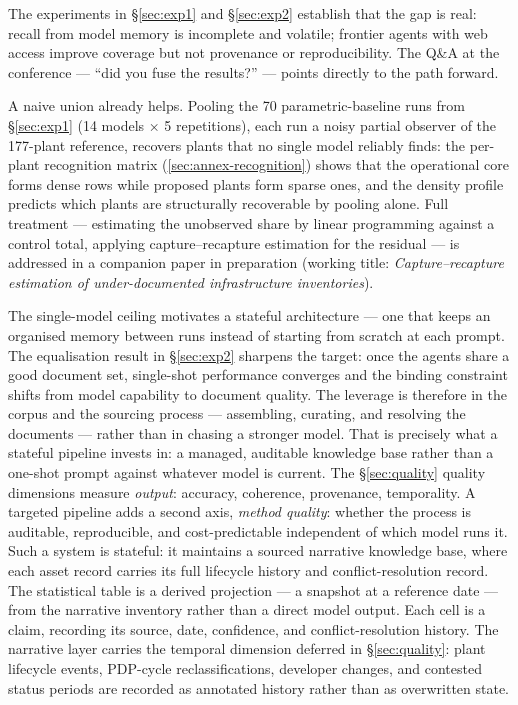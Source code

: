 \documentclass[a4paper,11pt]{article}
\begin{document}
The experiments in §\ref{sec:exp1} and §\ref{sec:exp2} establish that
the gap is real: recall from model memory is incomplete and volatile;
frontier agents with web access improve coverage but not provenance or
reproducibility. The Q\&A at the conference --- ``did you fuse the
results?'' --- points directly to the path forward.

A naive union already helps. Pooling the 70 parametric-baseline runs
from §\ref{sec:exp1} (14 models × 5 repetitions), each run a noisy
partial observer of the 177-plant reference, recovers plants that no
single model reliably finds: the per-plant recognition matrix
(\ref{sec:annex-recognition}) shows that the operational core forms
dense rows while proposed plants form sparse ones, and the density
profile predicts which plants are structurally recoverable by pooling
alone. Full treatment --- estimating the unobserved share by linear
programming against a control total, applying capture--recapture
estimation for the residual --- is addressed in a companion paper in
preparation (working title: \emph{Capture--recapture estimation of
under-documented infrastructure inventories}).

The single-model ceiling motivates a stateful architecture --- one that
keeps an organised memory between runs instead of starting from scratch
at each prompt. The equalisation result in §\ref{sec:exp2} sharpens the
target: once the agents share a good document set, single-shot
performance converges and the binding constraint shifts from model
capability to document quality. The leverage is therefore in the corpus
and the sourcing process --- assembling, curating, and resolving the
documents --- rather than in chasing a stronger model. That is precisely
what a stateful pipeline invests in: a managed, auditable knowledge base
rather than a one-shot prompt against whatever model is current. The
§\ref{sec:quality} quality dimensions measure \emph{output}: accuracy,
coherence, provenance, temporality. A targeted pipeline adds a second
axis, \emph{method quality}: whether the process is auditable,
reproducible, and cost-predictable independent of which model runs it.
Such a system is stateful: it maintains a sourced narrative knowledge
base, where each asset record carries its full lifecycle history and
conflict-resolution record. The statistical table is a derived
projection --- a snapshot at a reference date --- from the narrative
inventory rather than a direct model output. Each cell is a claim,
recording its source, date, confidence, and conflict-resolution history.
The narrative layer carries the temporal dimension deferred in
§\ref{sec:quality}: plant lifecycle events, PDP-cycle reclassifications,
developer changes, and contested status periods are recorded as
annotated history rather than as overwritten state.
\end{document}
